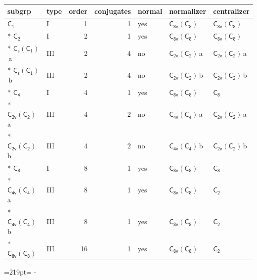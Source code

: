 \documentclass[10pt,a4paper]{article}
\newcommand{\needspace}[1]{\par\penalty-100\begingroup\dimen0=#1\relax\dimen2=\pagegoal
  \advance\dimen2-\pagetotal\ifdim\dimen0>\dimen2\relax\ifdim\dimen2>0pt\vfil\break\fi\fi
  \endgroup}
\numberwithin{equation}{section}
\newcommand{\grp}[1]{\mathsf{#1}}
\newcommand{\clsletter}[1]{\,{\scriptsize\color{black!55}#1}}
\begin{document}
{\small\begin{longtable}{@{}llrrlll@{}}\toprule
subgrp & type & order & conjugates & normal & normalizer & centralizer\\\midrule\endhead
\bottomrule\endfoot\endlastfoot
\href{../../../rotation/data/pdf/C1.pdf}{$\grp{C_{1}}$} & I & 1 & 1 & yes & \href{C8v-C8.pdf}{$\grp{C_{8v}}(\grp{C_{8}})$} & \href{C8v-C8.pdf}{$\grp{C_{8v}}(\grp{C_{8}})$}\\*
\href{../../../rotation/data/pdf/C2.pdf}{$\grp{C_{2}}$} & I & 2 & 1 & yes & \href{C8v-C8.pdf}{$\grp{C_{8v}}(\grp{C_{8}})$} & \href{C8v-C8.pdf}{$\grp{C_{8v}}(\grp{C_{8}})$}\\*
\href{C1v-C1.pdf}{$\grp{C_{s}}(\grp{C_{1}})$}\clsletter{a} & III & 2 & 4 & no & \href{C2v-C2.pdf}{$\grp{C_{2v}}(\grp{C_{2}})$}\clsletter{a} & \href{C2v-C2.pdf}{$\grp{C_{2v}}(\grp{C_{2}})$}\clsletter{a}\\*
\href{C1v-C1.pdf}{$\grp{C_{s}}(\grp{C_{1}})$}\clsletter{b} & III & 2 & 4 & no & \href{C2v-C2.pdf}{$\grp{C_{2v}}(\grp{C_{2}})$}\clsletter{b} & \href{C2v-C2.pdf}{$\grp{C_{2v}}(\grp{C_{2}})$}\clsletter{b}\\*
\href{../../../rotation/data/pdf/C4.pdf}{$\grp{C_{4}}$} & I & 4 & 1 & yes & \href{C8v-C8.pdf}{$\grp{C_{8v}}(\grp{C_{8}})$} & \href{../../../rotation/data/pdf/C8.pdf}{$\grp{C_{8}}$}\\*
\href{C2v-C2.pdf}{$\grp{C_{2v}}(\grp{C_{2}})$}\clsletter{a} & III & 4 & 2 & no & \href{C4v-C4.pdf}{$\grp{C_{4v}}(\grp{C_{4}})$}\clsletter{a} & \href{C2v-C2.pdf}{$\grp{C_{2v}}(\grp{C_{2}})$}\clsletter{a}\\*
\href{C2v-C2.pdf}{$\grp{C_{2v}}(\grp{C_{2}})$}\clsletter{b} & III & 4 & 2 & no & \href{C4v-C4.pdf}{$\grp{C_{4v}}(\grp{C_{4}})$}\clsletter{b} & \href{C2v-C2.pdf}{$\grp{C_{2v}}(\grp{C_{2}})$}\clsletter{b}\\*
\href{../../../rotation/data/pdf/C8.pdf}{$\grp{C_{8}}$} & I & 8 & 1 & yes & \href{C8v-C8.pdf}{$\grp{C_{8v}}(\grp{C_{8}})$} & \href{../../../rotation/data/pdf/C8.pdf}{$\grp{C_{8}}$}\\*
\href{C4v-C4.pdf}{$\grp{C_{4v}}(\grp{C_{4}})$}\clsletter{a} & III & 8 & 1 & yes & \href{C8v-C8.pdf}{$\grp{C_{8v}}(\grp{C_{8}})$} & \href{../../../rotation/data/pdf/C2.pdf}{$\grp{C_{2}}$}\\*
\href{C4v-C4.pdf}{$\grp{C_{4v}}(\grp{C_{4}})$}\clsletter{b} & III & 8 & 1 & yes & \href{C8v-C8.pdf}{$\grp{C_{8v}}(\grp{C_{8}})$} & \href{../../../rotation/data/pdf/C2.pdf}{$\grp{C_{2}}$}\\*
\href{C8v-C8.pdf}{$\grp{C_{8v}}(\grp{C_{8}})$} & III & 16 & 1 & yes & \href{C8v-C8.pdf}{$\grp{C_{8v}}(\grp{C_{8}})$} & \href{../../../rotation/data/pdf/C2.pdf}{$\grp{C_{2}}$}\\
\bottomrule\end{longtable}}
\needspace{219pt}
\end{document}
